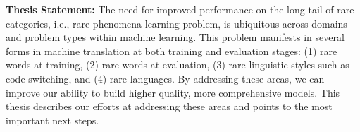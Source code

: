 
\noindent \textbf{Thesis Statement:} The need for improved performance on the long tail of rare categories, i.e., rare phenomena learning problem, is ubiquitous across domains and problem types within machine learning.
This problem manifests in several forms in machine translation at both training and evaluation stages: 
(1) rare words at training, 
(2) rare words at evaluation, 
(3) rare linguistic styles such as code-switching, 
and (4) rare languages. 
By addressing these areas, we can improve our ability to build higher quality, more comprehensive models. This thesis describes our efforts at addressing these areas and points to the most important next steps.


